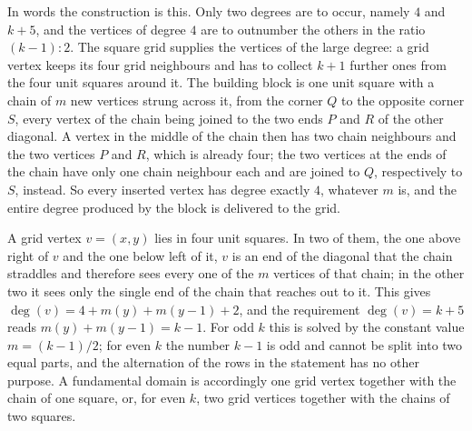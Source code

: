 \documentclass[12pt,a4paper]{article}%
\begin{document}
In words the construction is this. Only two degrees are to occur, namely $4$ and $k+5$, and the
vertices of degree $4$ are to outnumber the others in the ratio $(k-1):2$. The square grid supplies
the vertices of the large degree: a grid vertex keeps its four grid neighbours and has to collect
$k+1$ further ones from the four unit squares around it. The building block is one unit square with a
chain of $m$ new vertices strung across it, from the corner $Q$ to the opposite corner $S$, every
vertex of the chain being joined to the two ends $P$ and $R$ of the other diagonal. A vertex in the
middle of the chain then has two chain neighbours and the two vertices $P$ and $R$, which is already
four; the two vertices at the ends of the chain have only one chain neighbour each and are joined to
$Q$, respectively to $S$, instead. So every inserted vertex has degree exactly $4$, whatever $m$ is,
and the entire degree produced by the block is delivered to the grid.

A grid vertex $v=(x,y)$ lies in four unit squares. In two of them, the one above right of $v$ and the
one below left of it, $v$ is an end of the diagonal that the chain straddles and therefore sees every
one of the $m$ vertices of that chain; in the other two it sees only the single end of the chain that
reaches out to it. This gives $\deg (v)=4+m(y)+m(y-1)+2$, and the requirement $\deg (v)=k+5$ reads
$m(y)+m(y-1)=k-1$. For odd $k$ this is solved by the constant value $m=(k-1)/2$; for even $k$ the
number $k-1$ is odd and cannot be split into two equal parts, and the alternation of the rows in the
statement has no other purpose. A fundamental domain is accordingly one grid vertex together with the
chain of one square, or, for even $k$, two grid vertices together with the chains of two squares.

\end{document}
